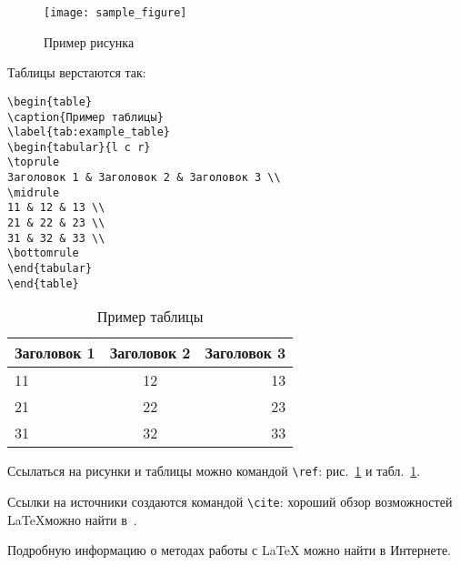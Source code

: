 \begin{figure}
\centering
\texttt{[image: sample\_figure]}
\caption{Пример рисунка}
\label{fig:sample_figure}
\end{figure}

Таблицы верстаются так:
\begin{verbatim}
\begin{table}
\caption{Пример таблицы}
\label{tab:example_table}
\begin{tabular}{l c r}
\toprule
Заголовок 1 & Заголовок 2 & Заголовок 3 \\
\midrule
11 & 12 & 13 \\
21 & 22 & 23 \\
31 & 32 & 33 \\
\bottomrule
\end{tabular}
\end{table}
\end{verbatim}

\begin{table}
\caption{Пример таблицы}
\label{tab:example_table}
\begin{tabular}{l c r}
\toprule
Заголовок 1 & Заголовок 2 & Заголовок 3 \\
\midrule
11 & 12 & 13 \\
21 & 22 & 23 \\
31 & 32 & 33 \\
\bottomrule
\end{tabular}
\end{table}

Ссылаться на рисунки и таблицы можно командой \verb|\ref|: рис.~\ref{fig:sample_figure} и табл.~\ref{tab:example_table}.

Ссылки на источники создаются командой \verb|\cite|: хороший обзор возможностей \LaTeX можно найти в~\cite{oetiker1995not}.

Подробную информацию о методах работы с \LaTeX{} можно найти в Интернете.

